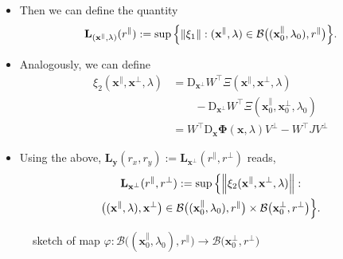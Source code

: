 \documentclass[letterpaper, 10 pt, conference, dvipsnames]{ieeeconf}
\begin{document}
\begin{itemize}
\begin{align*}
                & - \begin{bmatrix} 0 & W^\top\mathrm{D}_{\lambda}\boldsymbol{\Phi}(\mathbf{x}_0,\lambda_0)\end{bmatrix}.
          \end{align*}
    \item Then we can define the quantity
          \begin{gather}
              \mathbf{L}_{(\mathbf{x}^\parallel,\lambda)}(r^\parallel) := \sup\Big\{\norm{\xi_1}:(\mathbf{x}^\parallel,\lambda)\in\mathcal{B}\big((\mathbf{x}^\parallel_0,\lambda_0),r^\parallel\big)\Big\}.\label{def:L_x-LSR}
          \end{gather}
    \item Analogously, we can define
          \begin{align*}
              \xi_2(\mathbf{x}^{\parallel}, \mathbf{x}^{\perp},\lambda) & = \mathrm{D}_{\mathbf{x}^\perp} W^\top\Xi(\mathbf{x}^\parallel,\mathbf{x}^\perp,\lambda)                \\
                                                                        & \qquad - \mathrm{D}_{\mathbf{x}^\perp} W^\top\Xi(\mathbf{x}^\parallel_0,\mathbf{x}^\perp_0,  \lambda_0) \\
                                                                        & = W^\top\mathrm{D}_{\mathbf{x}}\mathbf{\Phi}(\mathbf{x},\lambda)V^{\perp}-W^\top JV^{\perp}
          \end{align*}
    \item Using the above, \(\mathbf{L}_{\mathbf{y}}(r_x, r_y) := \mathbf{L}_{\mathbf{x}^\perp}(r^\parallel,r^\perp)\) reads,
          \begin{multline}
              \mathbf{L}_{\mathbf{x}^\perp}(r^\parallel,r^\perp) := \sup\Big\{\norm{\xi_2(\mathbf{x}^{\parallel}, \mathbf{x}^{\perp},\lambda)}:      \\
              \big((\mathbf{x}^\parallel,\lambda),\mathbf{x}^\perp\big) \in\mathcal{B}\big((\mathbf{x}^\parallel_0,\lambda_0),r^\parallel\big)\times\mathcal{B}\big(\mathbf{x}^\perp_0,r^\perp\big)\Big\}. \label{def:L_y-LSR}
          \end{multline}
\end{itemize}

\begin{figure}[ht!]
    \centering
    
    \caption{sketch of map \(\varphi:\mathcal{B}\big((\mathbf{x}^\parallel_0,\lambda_0),r^\parallel\big)\to\mathcal{B}\big(\mathbf{x}^\perp_0,r^\perp\big)\) \label{fig:map}}
    \vspace{-6mm}
\end{figure}
\end{document}
